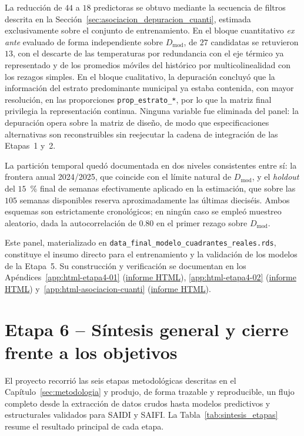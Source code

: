 La reducción de $44$ a $18$ predictoras se obtuvo mediante la secuencia de filtros descrita en la Sección~\ref{sec:asociacion_depuracion_cuanti}, estimada exclusivamente sobre el conjunto de entrenamiento. En el bloque cuantitativo \emph{ex ante} evaluado de forma independiente sobre $D_{\mathrm{mod}}$, de $27$ candidatas se retuvieron $13$, con el descarte de las temperaturas por redundancia con el eje térmico ya representado y de los promedios móviles del histórico por multicolinealidad con los rezagos simples. En el bloque cualitativo, la depuración concluyó que la información del estrato predominante municipal ya estaba contenida, con mayor resolución, en las proporciones \texttt{prop\_estrato\_*}, por lo que la matriz final privilegia la representación continua. Ninguna variable fue eliminada del panel: la depuración opera sobre la matriz de diseño, de modo que especificaciones alternativas son reconstruibles sin reejecutar la cadena de integración de las Etapas~1 y~2.

La partición temporal quedó documentada en dos niveles consistentes entre sí: la frontera anual 2024/2025, que coincide con el límite natural de $D_{\mathrm{mod}}$, y el \emph{holdout} del $15$~\% final de semanas efectivamente aplicado en la estimación, que sobre las $105$ semanas disponibles reserva aproximadamente las últimas dieciséis. Ambos esquemas son estrictamente cronológicos; en ningún caso se empleó muestreo aleatorio, dada la autocorrelación de $0{.}80$ en el primer rezago sobre $D_{\mathrm{mod}}$.

Este panel, materializado en \texttt{data\_final\_modelo\_cuadrantes\_reales.rds}, constituye el insumo directo para el entrenamiento y la validación de los modelos de la Etapa~5. Su construcción y verificación se documentan en los Apéndices~\ref{app:html-etapa4-01} (\href{\urlEtapaCuatroUno}{informe HTML}), \ref{app:html-etapa4-02} (\href{\urlEtapaCuatroDos}{informe HTML}) y~\ref{app:html-asociacion-cuanti} (\href{\urlasociaciondepuracioncuanti}{informe HTML}).





\section{Etapa 6 – Síntesis general y cierre frente a los objetivos}
\label{sec:resultados-etapa6}

El proyecto recorrió las seis etapas metodológicas descritas en el Capítulo~\ref{sec:metodologia} y produjo, de forma trazable y reproducible, un flujo completo desde la extracción de datos crudos hasta modelos predictivos y estructurales validados para SAIDI y SAIFI. La Tabla~\ref{tab:sintesis_etapas} resume el resultado principal de cada etapa.

